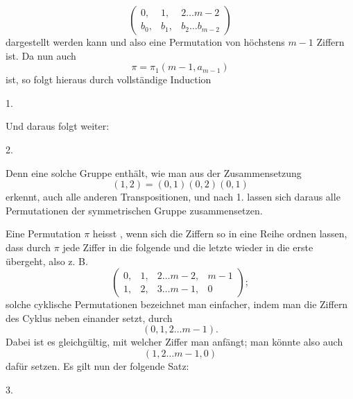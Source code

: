 \[
\begin{pmatrix} 0, & 1, & 2 \dots m-2 \\ b_0, & b_1, & b_2 \dots b_{m-2} \end{pmatrix}
\]
dargestellt werden kann und also eine Permutation von höchstens $m-1$ Ziffern ist. Da nun auch
\[
\pi = \pi_1(m-1, a_{m-1})
\]
ist, so folgt hieraus durch vollständige Induction

1. 

Und daraus folgt weiter:

2. 

Denn eine solche Gruppe enthält, wie man aus der Zusammensetzung
\[
(1,2) = (0,1)(0,2)(0,1)
\]
erkennt, auch alle anderen Transpositionen, und nach 1. lassen sich daraus alle Permutationen der symmetrischen Gruppe zusammensetzen.

Eine Permutation $\pi$ heisst , wenn sich die Ziffern so in eine Reihe ordnen lassen, dass durch $\pi$ jede Ziffer in die folgende und die letzte wieder in die erste übergeht, also z. B.
\[
\begin{pmatrix} 0, & 1, & 2 \dots m-2, & m-1 \\ 1, & 2, & 3 \dots m-1, & 0 \end{pmatrix};
\]
solche cyklische Permutationen bezeichnet man einfacher, indem man die Ziffern des Cyklus neben einander setzt, durch
\[
(0, 1, 2 \dots m-1).
\]
Dabei ist es gleichgültig, mit welcher Ziffer man anfängt; man könnte also auch
\[
(1, 2 \dots m-1, 0)
\]
dafür setzen. Es gilt nun der folgende Satz:

3. 
